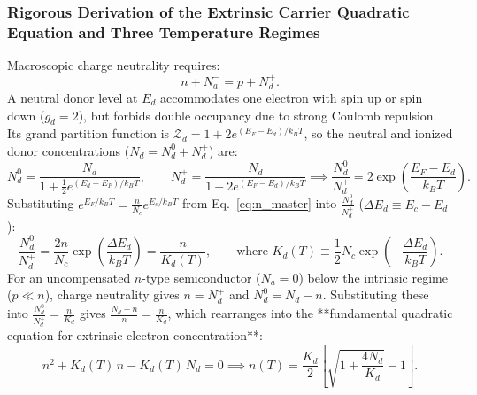 \documentclass[11pt,a4paper]{article}
\begin{document}
\subsubsection{Rigorous Derivation of the Extrinsic Carrier Quadratic Equation and Three Temperature Regimes}
Macroscopic charge neutrality requires:
\begin{equation}
    \boxed{n + N_a^- = p + N_d^+.}
    \label{eq:neutrality_master}
\end{equation}
A neutral donor level at $E_d$ accommodates one electron with spin up or spin down ($g_d = 2$), but forbids double occupancy due to strong Coulomb repulsion. Its grand partition function is $\mathcal{Z}_d = 1 + 2e^{(E_F - E_d)/k_BT}$, so the neutral and ionized donor concentrations ($N_d = N_d^0 + N_d^+$) are:
\begin{equation}
    N_d^0 = \frac{N_d}{1 + \frac{1}{2}e^{(E_d - E_F)/k_BT}}, \qquad N_d^+ = \frac{N_d}{1 + 2e^{(E_F - E_d)/k_BT}} \implies \frac{N_d^0}{N_d^+} = 2\exp\left(\frac{E_F - E_d}{k_B T}\right).
\end{equation}
Substituting $e^{E_F/k_BT} = \frac{n}{N_c}e^{E_c/k_BT}$ from Eq.~\eqref{eq:n_master} into $\frac{N_d^0}{N_d^+}$ ($\Delta E_d \equiv E_c - E_d$):
\begin{equation}
    \frac{N_d^0}{N_d^+} = \frac{2n}{N_c}\exp\left(\frac{\Delta E_d}{k_B T}\right) = \frac{n}{K_d(T)}, \qquad \text{where } \boxed{K_d(T) \equiv \frac{1}{2}N_c\exp\left(-\frac{\Delta E_d}{k_B T}\right).}
\end{equation}
For an uncompensated $n$-type semiconductor ($N_a = 0$) below the intrinsic regime ($p \ll n$), charge neutrality gives $n = N_d^+$ and $N_d^0 = N_d - n$. Substituting these into $\frac{N_d^0}{N_d^+} = \frac{n}{K_d}$ gives $\frac{N_d - n}{n} = \frac{n}{K_d}$, which rearranges into the **fundamental quadratic equation for extrinsic electron concentration**:
\begin{equation}
    \boxed{n^2 + K_d(T)\,n - K_d(T)\,N_d = 0 \implies n(T) = \frac{K_d}{2}\left[\sqrt{1 + \frac{4N_d}{K_d}} - 1\right].}
    \label{eq:quadratic_n_master}
\end{equation}
\end{document}
